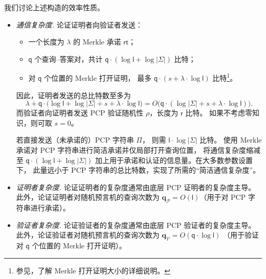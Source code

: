 \documentclass[american,singlepageview]{snargs-book-zh}
\newcommand{\DoQuote}[1]{``#1''}
\newcommand{\Cardinality}[1]{\left|{#1}\right|}
\newcommand{\ProtoProver}{P}
\newcommand{\ProtoVerifier}{V}
\newcommand{\ProtoAlphabet}{\Sigma}
\newcommand{\ProtoProofLength}{\mathsf{l}}
\newcommand{\ProtoQueryComplexity}{\mathsf{q}}
\newcommand{\ProtoRandomnessComplexity}{\mathsf{r}}
\newcommand{\PCPString}{\Pi}
\newcommand{\PCPVerifierRandomMessage}{\rho}
\newcommand{\PCPAlphabet}{\ProtoAlphabet}
\newcommand{\PCPProofLength}{\ProtoProofLength}
\newcommand{\PCPRandomnessComplexity}{\ProtoRandomnessComplexity}
\newcommand{\PCPQueryComplexity}{\ProtoQueryComplexity}
\newcommand{\ARGFormat}[1]{\mathcal{#1}}
\newcommand{\ARGProver}{\ARGFormat{\ProtoProver}}
\newcommand{\ARGVerifier}{\ARGFormat{\ProtoVerifier}}
\newcommand{\ARGComplexityFormat}[1]{\mathbf{#1}}
\newcommand{\ARGQueryP}{\ARGComplexityFormat{q}_{\scriptscriptstyle\ARGProver}}
\newcommand{\ARGQueryV}{\ARGComplexityFormat{q}_{\scriptscriptstyle\ARGVerifier}}
\newcommand{\SecurityParameter}{\lambda}
\newcommand{\PrivacyParameter}{s}
\newcommand{\MTCommitment}{\mathsf{rt}}
\begin{document}
我们讨论上述构造的效率性质。
\begin{itemize}

  \item \emph{通信复杂度.}
    论证证明者向验证者发送：
    \begin{itemize}[nolistsep]
      \item 一个长度为 $\SecurityParameter$ 的 Merkle 承诺 $\MTCommitment$；
      \item $\PCPQueryComplexity$ 个查询–答案对，共计
        $\PCPQueryComplexity\cdot(\log\PCPProofLength+\log\Cardinality{\PCPAlphabet})$ 比特；
      \item 对 $\PCPQueryComplexity$ 个位置的 Merkle 打开证明，
        最多 $\PCPQueryComplexity\cdot(\PrivacyParameter+\SecurityParameter\cdot\log\PCPProofLength)$ 比特\footnote{参见，了解 Merkle 打开证明大小的详细说明。}。
    \end{itemize}
    因此，证明者发送的总比特数至多为
    \[
      \SecurityParameter
      +
      \PCPQueryComplexity\cdot
      \bigl(\log\PCPProofLength
      +\log\Cardinality{\PCPAlphabet}
      +\PrivacyParameter
      +\SecurityParameter\cdot\log\PCPProofLength
      \bigr)
      =
      O\bigl(
        \PCPQueryComplexity\cdot(\log\Cardinality{\PCPAlphabet}+\PrivacyParameter+\SecurityParameter\cdot\log\PCPProofLength)
      \bigr).
    \]
    而验证者向证明者发送 PCP 验证随机性
    $\PCPVerifierRandomMessage$，长度为 $\PCPRandomnessComplexity$ 比特。
    如果不考虑零知识，则可取 $\PrivacyParameter=0$。

    若直接发送（未承诺的）PCP 字符串 $\PCPString$，
    则需 $\PCPProofLength\cdot\log\Cardinality{\PCPAlphabet}$ 比特。
    使用 Merkle 承诺对 PCP 字符串进行简洁承诺并仅局部打开查询位置，
    将通信复杂度缩减至
    $\PCPQueryComplexity\cdot(\log\PCPProofLength+\log\Cardinality{\PCPAlphabet})$
    加上用于承诺和认证的信息量。在大多数参数设置下，
    此量远小于 PCP 字符串的总比特数，实现了所需的\DoQuote{简洁通信复杂度}。

  \item \emph{证明者复杂度.}
    论证证明者的复杂度通常由底层 PCP 证明者的复杂度主导。
    此外，论证证明者对随机预言机的查询次数为
    $\ARGQueryP=O(\PCPProofLength)$（用于对 PCP 字符串进行承诺）。

  \item \emph{验证者复杂度.}
    论证验证者的复杂度通常由底层 PCP 验证者的复杂度主导。
    此外，论证验证者对随机预言机的查询次数为
    $\ARGQueryV=O(\PCPQueryComplexity\cdot\log\PCPProofLength)$
    （用于验证对 $\PCPQueryComplexity$ 个位置的 Merkle 打开证明）。

\end{itemize}
\end{document}
